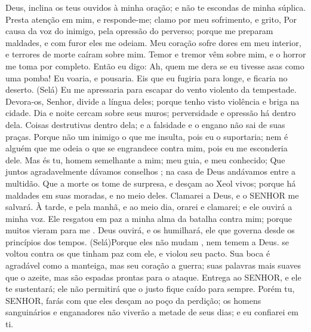 {\PP 
  Deus, inclina os teus ouvidos à minha oração; e não te escondas de minha súplica.
  Presta atenção em mim, e responde-me; clamo por meu sofrimento, e grito,
  Por causa da voz do inimigo,
{} pela opressão do perverso; porque me preparam
{} maldades, e com furor eles me odeiam.
  Meu coração sofre dores em meu interior, e terrores de morte caíram sobre mim.
  Temor e tremor vêm sobre mim, e o horror me toma por completo.
  Então eu digo: Ah, quem me dera se eu tivesse asas como uma pomba! Eu voaria, e pousaria.
  Eis que eu fugiria para longe, e ficaria no deserto. (Selá)
  Eu me apressaria para escapar do vento violento
{} da tempestade.
  Devora-os, Senhor, divide a língua deles; porque tenho visto violência e briga na cidade.
  Dia e noite cercam sobre seus muros; perversidade e opressão há dentro dela.
  Coisas destrutivas
{} dentro dela; e a falsidade e o engano não sai de suas praças.
  Porque não
{} um inimigo o que me insulta, pois
{} eu o suportaria; nem é alguém que me odeia o que se engrandece contra mim, pois
{} eu me esconderia dele.
  Mas és tu, homem semelhante a mim; meu guia, e meu conhecido;
  Que juntos agradavelmente dávamos conselhos
{} ; na casa de Deus andávamos entre a multidão.
  Que a morte os tome de surpresa, e desçam ao Xeol
 vivos; porque há maldades em suas moradas, e no meio deles.
  Clamarei a Deus, e o SENHOR me salvará.
  À tarde, e pela manhã, e ao meio dia, orarei e clamarei; e ele ouvirá a minha voz.
  Ele resgatou em paz a minha alma da batalha
{} contra mim; porque muitos vieram para me
{} .
  Deus ouvirá, e os humilhará, ele que governa desde os princípios dos tempos. (Selá)Porque eles não mudam
{},  nem temem a Deus.
   se voltou contra os que tinham paz com ele, e violou seu pacto.
  Sua boca é agradável como a manteiga, mas seu coração
{} a guerra; suas palavras
{} mais suaves que o azeite, mas são espadas prontas para o ataque.
  Entrega
{} ao SENHOR, e ele te sustentará; ele não permitirá que o justo fique caído para sempre.
  Porém tu, SENHOR, farás com que eles desçam ao poço da perdição; os homens sanguinários e enganadores não viverão a metade de seus dias; e eu confiarei em ti.
\par }

